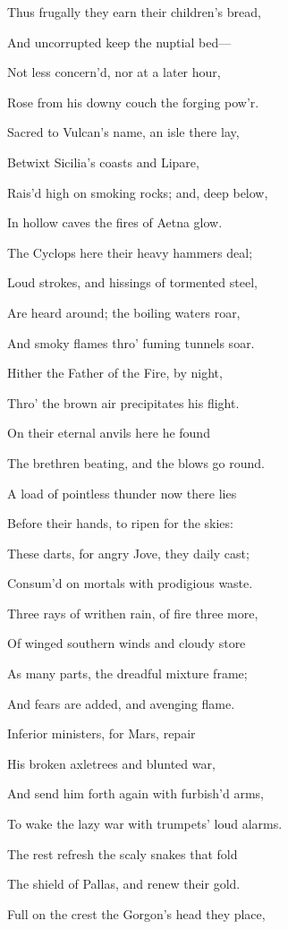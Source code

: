 Thus frugally they earn their children’s bread,

And uncorrupted keep the nuptial bed—

Not less concern’d, nor at a later hour,

Rose from his downy couch the forging pow’r.

Sacred to Vulcan’s name, an isle there lay,

Betwixt Sicilia’s coasts and Lipare,

Rais’d high on smoking rocks; and, deep below,

In hollow caves the fires of Aetna glow.

The Cyclops here their heavy hammers deal;

Loud strokes, and hissings of tormented steel,

Are heard around; the boiling waters roar,

And smoky flames thro’ fuming tunnels soar.

Hither the Father of the Fire, by night,

Thro’ the brown air precipitates his flight.

On their eternal anvils here he found

The brethren beating, and the blows go round.

A load of pointless thunder now there lies

Before their hands, to ripen for the skies:

These darts, for angry Jove, they daily cast;

Consum’d on mortals with prodigious waste.

Three rays of writhen rain, of fire three more,

Of winged southern winds and cloudy store

As many parts, the dreadful mixture frame;

And fears are added, and avenging flame.

Inferior ministers, for Mars, repair

His broken axletrees and blunted war,

And send him forth again with furbish’d arms,

To wake the lazy war with trumpets’ loud alarms.

The rest refresh the scaly snakes that fold

The shield of Pallas, and renew their gold.

Full on the crest the Gorgon’s head they place,

